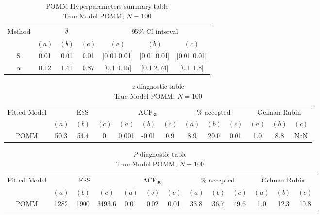 \documentclass[11pt]{amsart}
\begin{document}
\begin{table}[htbp]
\centering
\caption*{
{\large POMM Hyperparameters summary table} \\ 
{\small True Model POMM, $N=100$}
} 
\begin{tabular}{ccccccc}
\toprule
\multirow{2}{*}{Method} & \multicolumn{3}{c}{
$\hat{\theta}$} & \multicolumn{3}{c}{
95$\%$ CI interval}  \\
\cmidrule(lr){2-4} \cmidrule(lr){5-7} 
& $(a)$ & $(b)$ & $(c)$ & $(a)$ & $(b)$ & $(c)$  \\
\midrule
S  &0.01 & 0.01 & 0.01 & [0.01	0.01] & [0.01	0.01] & [0.01	0.01]   \\
$\alpha$ & 0.12 & 1.41 & 0.87 & [0.1	0.15] & [0.1	2.74] & [0.1	1.8] \\
\bottomrule
\end{tabular}
\label{table:simulations_from_simple}
\end{table}








\begin{table}[htbp]
\centering
\caption*{
{\large $z$ diagnostic table} \\ 
{\small True Model POMM, $N=100$}
} 
\begin{tabular}{ccccccccccccc}
\toprule
\multirow{2}{*}{Fitted Model} & \multicolumn{3}{c}{ESS} & \multicolumn{3}{c}{
ACF$_{30}$} & \multicolumn{3}{c}{$\%$ accepted} & \multicolumn{3}{c}{Gelman-Rubin}\\
\cmidrule(lr){2-4} \cmidrule(lr){5-7} \cmidrule(lr){8-10} \cmidrule(lr){11-13} 
& $(a)$ & $(b)$ & $(c)$ & $(a)$ & $(b)$ & $(c)$ & $(a)$ & $(b)$ & $(c)$ & $(a)$ & $(b)$ & $(c)$ \\
\midrule
POMM &50.3 & 54.4 & 0 & 0.001 & -0.01 & 0.9 & 8.9 & 20.0 & 0.01 & 1.0 & 8.8 & NaN  \\
\bottomrule
\end{tabular}
\label{table:simulations_from_simple}
\end{table}

\begin{table}[htbp]
\centering
\caption*{
{\large $P$ diagnostic table} \\ 
{\small True Model POMM, $N=100$}
} 
\begin{tabular}{ccccccccccccc}
\toprule
\multirow{2}{*}{Fitted Model} & \multicolumn{3}{c}{ESS} & \multicolumn{3}{c}{
ACF$_{30}$} & \multicolumn{3}{c}{$\%$ accepted} & \multicolumn{3}{c}{Gelman-Rubin}\\
\cmidrule(lr){2-4} \cmidrule(lr){5-7} \cmidrule(lr){8-10} \cmidrule(lr){11-13} 
& $(a)$ & $(b)$ & $(c)$ & $(a)$ & $(b)$ & $(c)$ & $(a)$ & $(b)$ & $(c)$ & $(a)$ & $(b)$ & $(c)$ \\
\midrule
POMM &1282 & 1900 & 3493.6 & 0.01 & 0.02 & 0.01 & 33.8 & 36.7 & 49.6 & 1.0 & 12.3 & 10.8  \\
\bottomrule
\end{tabular}
\label{table:simulations_from_simple}
\end{table}
\end{document}
